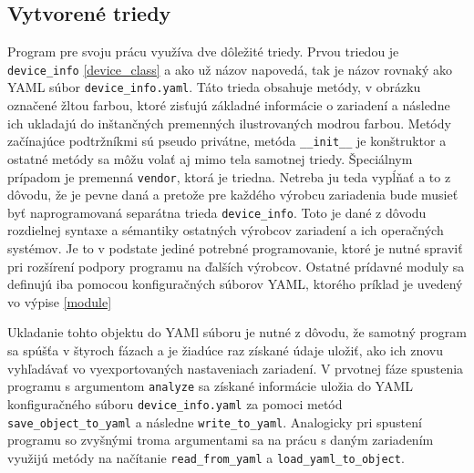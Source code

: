 \subsection{Vytvorené triedy}
Program pre svoju prácu využíva dve dôležité triedy. Prvou triedou je \texttt{device\_info} \ref{device_class} a ako už názov napovedá, tak je názov rovnaký ako YAML súbor \texttt{device\_info.yaml}. Táto trieda obsahuje metódy, v obrázku označené žltou farbou, ktoré zisťujú základné informácie o zariadení a následne ich ukladajú do inštančných premenných ilustrovaných modrou farbou. Metódy začínajúce podtržníkmi sú pseudo privátne, metóda \texttt{\_\_init\_\_} je konštruktor a ostatné metódy sa môžu volať aj mimo tela samotnej triedy. Špeciálnym prípadom je premenná \texttt{vendor}, ktorá je triedna. Netreba ju teda vypĺňať a to z dôvodu, že je pevne daná a pretože pre každého výrobcu zariadenia bude musieť byť naprogramovaná separátna trieda \texttt{device\_info}. Toto je dané z dôvodu rozdielnej syntaxe a sémantiky ostatných výrobcov zariadení a ich operačných systémov. Je to v podstate jediné potrebné programovanie, ktoré je nutné spraviť pri rozšírení podpory programu na ďalších výrobcov. Ostatné prídavné moduly sa definujú iba pomocou konfiguračných súborov YAML, ktorého príklad je uvedený vo výpise \ref{module} 

Ukladanie tohto objektu do YAMl súboru je nutné z dôvodu, že samotný program sa spúšťa v štyroch fázach a je žiadúce raz získané údaje uložiť, ako ich znovu vyhľadávať vo vyexportovaných nastaveniach zariadení. V prvotnej fáze spustenia programu s argumentom \texttt{analyze} sa získané informácie uložia do YAML konfiguračného súboru \texttt{device\_info.yaml} za pomoci metód \texttt{save\_object\_to\_yaml} a následne \texttt{write\_to\_yaml}. Analogicky pri spustení programu so zvyšnými troma argumentami sa na prácu s daným zariadením využijú metódy na načítanie \texttt{read\_from\_yaml} a \texttt{load\_yaml\_to\_object}. 

